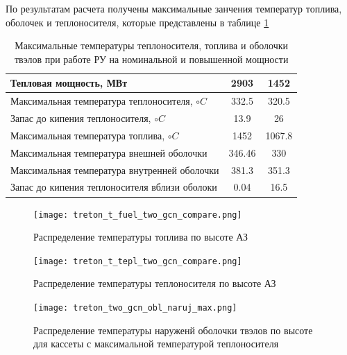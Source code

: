 По результатам расчета получены максимальные занчения температур топлива, оболочек и теплоносителя, которые представлены в таблице \ref{tabular:t-two-gcn-nominal-compare}

\begin{table}[H]
    \caption{Максимальные температуры теплоносителя, топлива и оболочки твэлов при работе РУ на номинальной и повышенной мощности}
    \begin{center}
        \begin{tabular}{|l|c|c|}
        \toprule
        Тепловая мощность, МВт & 2903 & 1452 \\
        \midrule
        \hline
        Максимальная температура теплоносителя, $\circ C$ & 332.5 & 320.5  \\ 
        \hline
        Запас до кипения теплоносителя, $\circ C$ & 13.9 & 26 \\
        \hline
        Максимальная температура топлива, $\circ C$ & 1452 & 1067.8  \\
        \hline
        Максимальная температура внешней оболочки & 346.46 & 330 \\
        \hline
        Максимальная температура внутренней оболочки & 381.3 & 351.3 \\
        \hline
        Запас до кипения теплоносителя вблизи оболоки & 0.04 & 16.5 \\
        \bottomrule
        \end{tabular}
		\label{tabular:t-two-gcn-nominal-compare}
    \end{center}
\end{table}

\begin{figure}[H]
	\begin{center}
		\texttt{[image: treton\_t\_fuel\_two\_gcn\_compare.png]}
		\caption{Распределение температуры топлива по высоте АЗ}
		\label{pic:treton-t-fuel-two-gcn-compare}
	\end{center}
\end{figure}

\begin{figure}[H]
	\begin{center}
		\texttt{[image: treton\_t\_tepl\_two\_gcn\_compare.png]}
		\caption{Распределение температуры теплоносителя по высоте АЗ}
		\label{pic:treton-t-tepl-two-gcn-compare}
	\end{center}
\end{figure}

\begin{figure}[H]
	\begin{center}
		\texttt{[image: treton\_two\_gcn\_obl\_naruj\_max.png]}
		\caption{Распределение температуры наруженй оболочки твэлов по высоте для кассеты с максимальной температурой теплоносителя}
		\label{pic:treton-two-gcn-obl-naruj-max}
	\end{center}
\end{figure}


